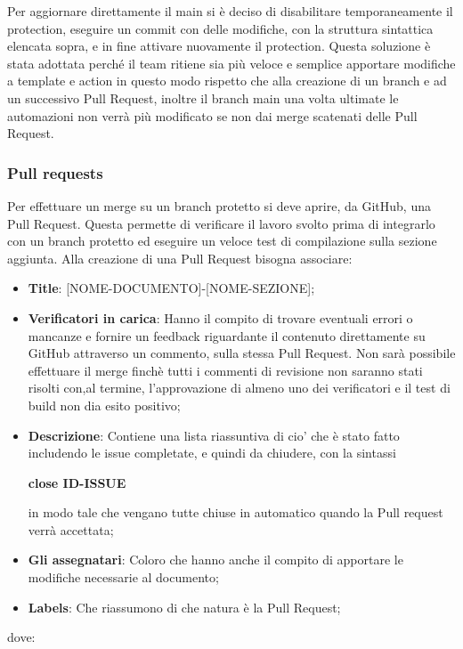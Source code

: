         Per aggiornare direttamente il main si è deciso di disabilitare temporaneamente
        il protection, eseguire un commit con delle modifiche, con la struttura sintattica elencata sopra, e in fine attivare nuovamente il protection.
        Questa soluzione è stata adottata perché il team ritiene sia più veloce e semplice apportare modifiche a template e action in questo modo
        rispetto che alla creazione di un branch e ad un successivo Pull Request, inoltre il branch main una volta ultimate le automazioni non verrà più modificato se non dai merge
        scatenati delle Pull Request.

        \subsubsection{Pull requests}\label{inf:pr}
        Per effettuare un merge su un branch protetto si deve aprire, da GitHub, una Pull Request. Questa
        permette di verificare il lavoro svolto prima di integrarlo con un branch protetto ed eseguire un veloce test di compilazione sulla sezione aggiunta.
        Alla creazione di una Pull Request bisogna associare:
        \begin{itemize}
            \item \textbf{Title}: [NOME-DOCUMENTO]-[NOME-SEZIONE];
            \item \textbf{Verificatori in carica}: Hanno il compito di trovare eventuali errori o mancanze e fornire un feedback
            riguardante il contenuto direttamente su GitHub attraverso un commento, sulla stessa Pull Request.
            Non sarà possibile effettuare il merge finchè tutti i commenti di revisione non saranno stati risolti
            con,al termine, l'approvazione di almeno uno dei verificatori e il test di build non dia esito positivo;
            \item \textbf{Descrizione}: Contiene una lista riassuntiva di cio' che è stato fatto includendo le issue completate, e quindi da chiudere,
            con la sintassi
            \begin{center}
                \textbf{close ID-ISSUE}
            \end{center}
            in modo tale che vengano tutte chiuse in automatico quando la Pull request verrà accettata;
            \item \textbf{Gli assegnatari}: Coloro che hanno anche il compito di apportare le modifiche necessarie al documento;
            \item \textbf{Labels}: Che riassumono di che natura è la Pull Request;
        \end{itemize}
        dove:

